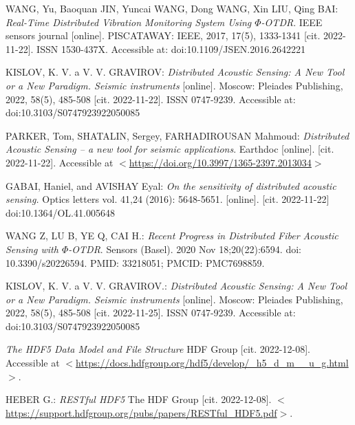 

\begin{thebibliography}{99}


WANG, Yu, Baoquan JIN, Yuncai WANG, Dong WANG, Xin LIU, Qing BAI: \emph{Real-Time Distributed Vibration Monitoring System Using $\Phi$-OTDR}. IEEE sensors journal [online]. PISCATAWAY: IEEE, 2017, 17(5), 1333-1341 [cit. 2022-11-22]. ISSN 1530-437X. Accessible at: doi:10.1109/JSEN.2016.2642221

KISLOV, K. V. a V. V. GRAVIROV: \emph{Distributed Acoustic Sensing: A New Tool or a New Paradigm. Seismic instruments} [online]. Moscow: Pleiades Publishing, 2022, 58(5), 485-508 [cit. 2022-11-22]. ISSN 0747-9239. Accessible at: doi:10.3103/S0747923922050085

PARKER, Tom, SHATALIN, Sergey, FARHADIROUSAN Mahmoud: \emph{Distributed Acoustic Sensing – a new tool for seismic applications}. Earthdoc [online]. [cit. 2022-11-22]. Accessible at \(<\)\url{https://doi.org/10.3997/1365-2397.2013034}\(>\)

GABAI, Haniel, and AVISHAY Eyal: \emph{On the sensitivity of distributed acoustic sensing.} Optics letters vol. 41,24 (2016): 5648-5651. [online]. [cit. 2022-11-22] doi:10.1364/OL.41.005648

WANG Z, LU B, YE Q, CAI H.: \emph{Recent Progress in Distributed Fiber Acoustic Sensing with $\Phi$-OTDR}. Sensors (Basel). 2020 Nov 18;20(22):6594. doi: 10.3390/s20226594. PMID: 33218051; PMCID: PMC7698859.

KISLOV, K. V. a V. V. GRAVIROV.: \emph{Distributed Acoustic Sensing: A New Tool or a New Paradigm. Seismic instruments} [online]. Moscow: Pleiades Publishing, 2022, 58(5), 485-508 [cit. 2022-11-25]. ISSN 0747-9239. Accessible at: doi:10.3103/S0747923922050085

\emph{The HDF5 Data Model and File Structure} HDF Group [cit. 2022-12-08]. Accessible at \(<\)\url{https://docs.hdfgroup.org/hdf5/develop/_h5_d_m__u_g.html}\(>\).

HEBER G.: \emph{RESTful HDF5} The HDF Group [cit. 2022-12-08].
\(<\)\url{https://support.hdfgroup.org/pubs/papers/RESTful_HDF5.pdf}\(>\).


\end{thebibliography}
